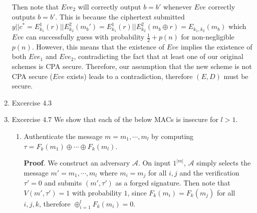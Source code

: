 \documentclass{article}
\begin{document}
\begin{enumerate}
Then note that $Eve_2$ will correctly output $b = b'$ whenever $Eve$ correctly outputs $b = b'$.
This is because the ciphertext submitted $y || c^* = E^1_{k_1}(r) || E^2_{k_2}(m_b') = E^1_{k_1}(r) || E^2_{k_2}(m_b \oplus r) = E_{k_1,k_2}(m_b)$
which $Eve$ can successfully guess with probability $\frac{1}{2} + p(n)$ for non-negligible $p(n)$. However,
this means that the existence of $Eve$ implies the existence of both $Eve_1$ and $Eve_2$, contradicting
the fact that at least one of our original schemes is CPA secure. Therefore, our assumption
that the new scheme is not CPA secure ($Eve$ exists) leads to a contradiction, therefore 
$(E,D)$ must be secure.%

\item{}
Excercise 4.3%

\item{}
Excercise 4.7
We show that each of the below MACs is insecure for $l > 1$.%

\begin{enumerate}[noitemsep,topsep=\mdcompacttopsep,label=\alph*.]%

\item{}Authenticate the message $m = m_1, \cdots, m_l$ by computing $\tau = F_k(m_1) \oplus \cdots \oplus F_k(m_l)$.

\begin{mdbmarginx}{1ex}{0pt}{1ex}{0pt}%
\noindent{}\textbf{Proof}.  We construct an adversary $\mathcal{A}$. On input $1^{|m|}$, $\mathcal{A}$ simply selects 
the message $m' = m_1, \cdots, m_l$ where $m_i = m_j$ for all $i,j$ and the verification $\tau' = 0$ and
submits $(m',\tau')$ as a forged signature. Then note that $V(m',\tau') = 1$ with probability $1$,
since $F_k(m_i) = F_k(m_j)$ for all $i,j,k$, therefore $\oplus_{i=1}^{l} F_k(m_i) = 0$.%
\end{mdbmarginx}%


\end{enumerate}
\end{enumerate}
\end{document}
